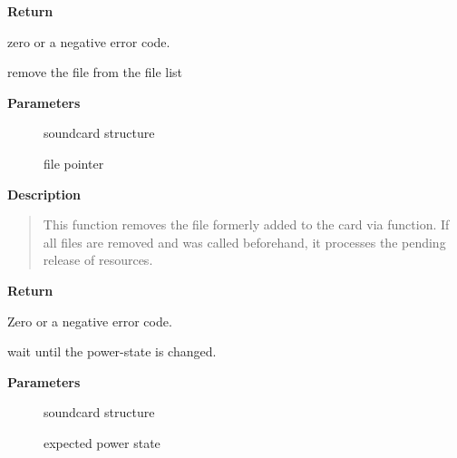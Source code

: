 \documentclass[a4paper,8pt,english]{sphinxmanual}
\begin{document}
\textbf{Return}

zero or a negative error code.

\begin{fulllineitems}
\label{sound/kernel-api/alsa-driver-api:c.snd_card_file_remove}
remove the file from the file list

\end{fulllineitems}


\textbf{Parameters}
\begin{description}
\item[{}] \leavevmode
soundcard structure

\item[{}] \leavevmode
file pointer

\end{description}

\textbf{Description}
\begin{quote}

This function removes the file formerly added to the card via
 function.
If all files are removed and  was
called beforehand, it processes the pending release of
resources.
\end{quote}

\textbf{Return}

Zero or a negative error code.

\begin{fulllineitems}
\label{sound/kernel-api/alsa-driver-api:c.snd_power_wait}
wait until the power-state is changed.

\end{fulllineitems}


\textbf{Parameters}
\begin{description}
\item[{}] \leavevmode
soundcard structure

\item[{}] \leavevmode
expected power state

\end{description}
\end{document}
